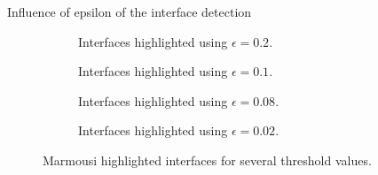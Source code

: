 \begin{frame}[noframenumbering]{Influence of epsilon of the interface detection}
  \small
\setlength{\modelwidth}{6.1cm}
\begin{figure}[!htbp]
\renewcommand{\cmapmin}{0}
\renewcommand{\cmapmax}{1}
\renewcommand{\modelfile}{image/mesh_adapt/interface_tresh_02}
\begin{subfigure}{0.5\textwidth}
\vspace{0.0cm}
\centering

\caption{Interfaces highlighted using $\epsilon=0.2$.}
\end{subfigure}
\hspace{-0.5cm}
\renewcommand{\modelfile}{image/mesh_adapt/interface_tresh_01}
\begin{subfigure}{0.5\textwidth}
\centering

\vspace{-0.7cm}
\caption{Interfaces highlighted using $\epsilon=0.1$.}
\end{subfigure}

\renewcommand{\modelfile}{image/grad_e}
\begin{subfigure}{0.5\textwidth}
\vspace{0.0cm}
\centering

\caption{Interfaces highlighted using $\epsilon=0.08$.}
\end{subfigure}
\hspace{-0.5cm}
\begin{subfigure}{0.5\textwidth}
\centering
\renewcommand{\modelfile}{image/mesh_adapt/interface_tresh_002}

\vspace{-0.7cm}
\caption{Interfaces highlighted using $\epsilon=0.02$.}
\end{subfigure}
\caption{Marmousi highlighted interfaces for several threshold values.}
\label{interface_thresholds}
\end{figure}
\end{frame}


